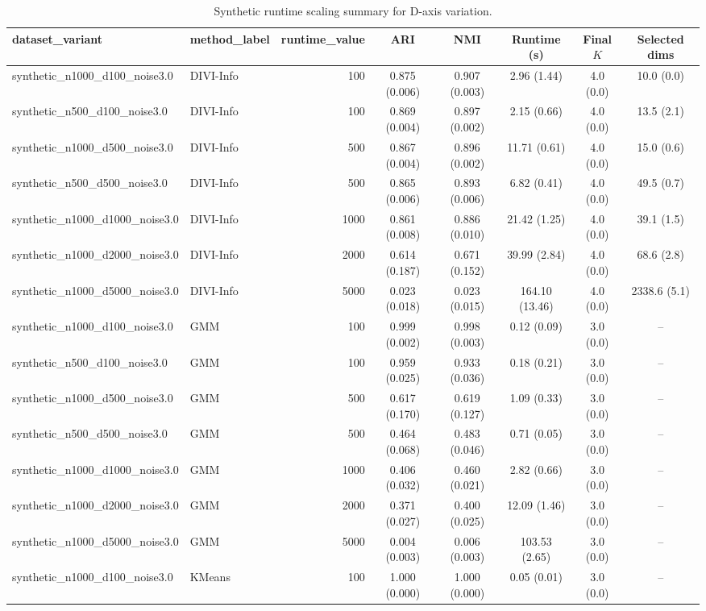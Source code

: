 \begin{table}[t]
\centering
\caption{Synthetic runtime scaling summary for D-axis variation.}
\label{tab:runtime-dscale}
\begin{tabular}{llrccccc}
\toprule
dataset_variant & method_label & runtime_value & ARI & NMI & Runtime (s) & Final $K$ & Selected dims \\
\midrule
synthetic_n1000_d100_noise3.0 & DIVI-Info & 100 & 0.875 (0.006) & 0.907 (0.003) & 2.96 (1.44) & 4.0 (0.0) & 10.0 (0.0) \\
synthetic_n500_d100_noise3.0 & DIVI-Info & 100 & 0.869 (0.004) & 0.897 (0.002) & 2.15 (0.66) & 4.0 (0.0) & 13.5 (2.1) \\
synthetic_n1000_d500_noise3.0 & DIVI-Info & 500 & 0.867 (0.004) & 0.896 (0.002) & 11.71 (0.61) & 4.0 (0.0) & 15.0 (0.6) \\
synthetic_n500_d500_noise3.0 & DIVI-Info & 500 & 0.865 (0.006) & 0.893 (0.006) & 6.82 (0.41) & 4.0 (0.0) & 49.5 (0.7) \\
synthetic_n1000_d1000_noise3.0 & DIVI-Info & 1000 & 0.861 (0.008) & 0.886 (0.010) & 21.42 (1.25) & 4.0 (0.0) & 39.1 (1.5) \\
synthetic_n1000_d2000_noise3.0 & DIVI-Info & 2000 & 0.614 (0.187) & 0.671 (0.152) & 39.99 (2.84) & 4.0 (0.0) & 68.6 (2.8) \\
synthetic_n1000_d5000_noise3.0 & DIVI-Info & 5000 & 0.023 (0.018) & 0.023 (0.015) & 164.10 (13.46) & 4.0 (0.0) & 2338.6 (5.1) \\
synthetic_n1000_d100_noise3.0 & GMM & 100 & 0.999 (0.002) & 0.998 (0.003) & 0.12 (0.09) & 3.0 (0.0) & -- \\
synthetic_n500_d100_noise3.0 & GMM & 100 & 0.959 (0.025) & 0.933 (0.036) & 0.18 (0.21) & 3.0 (0.0) & -- \\
synthetic_n1000_d500_noise3.0 & GMM & 500 & 0.617 (0.170) & 0.619 (0.127) & 1.09 (0.33) & 3.0 (0.0) & -- \\
synthetic_n500_d500_noise3.0 & GMM & 500 & 0.464 (0.068) & 0.483 (0.046) & 0.71 (0.05) & 3.0 (0.0) & -- \\
synthetic_n1000_d1000_noise3.0 & GMM & 1000 & 0.406 (0.032) & 0.460 (0.021) & 2.82 (0.66) & 3.0 (0.0) & -- \\
synthetic_n1000_d2000_noise3.0 & GMM & 2000 & 0.371 (0.027) & 0.400 (0.025) & 12.09 (1.46) & 3.0 (0.0) & -- \\
synthetic_n1000_d5000_noise3.0 & GMM & 5000 & 0.004 (0.003) & 0.006 (0.003) & 103.53 (2.65) & 3.0 (0.0) & -- \\
synthetic_n1000_d100_noise3.0 & KMeans & 100 & 1.000 (0.000) & 1.000 (0.000) & 0.05 (0.01) & 3.0 (0.0) & -- \\

\end{tabular}
\end{table}
